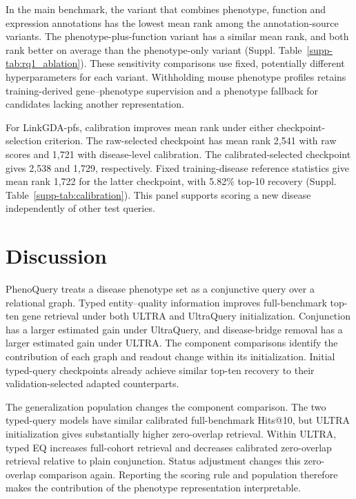 \documentclass[webpdf,contemporary,large]{oup-authoring-template}%
\theoremstyle{thmstyleone}%
\theoremstyle{thmstyletwo}%
\theoremstyle{thmstylethree}%
\begin{document}
In the main benchmark, the variant that combines phenotype, function and
expression annotations has the lowest mean rank among the annotation-source
variants. The phenotype-plus-function variant has a similar mean rank, and
both rank better on average than the phenotype-only variant
(Suppl. Table~\ref{supp-tab:rq1_ablation}). These sensitivity
comparisons use fixed, potentially different hyperparameters for each variant.
Withholding mouse phenotype
profiles retains training-derived gene--phenotype supervision and a phenotype
fallback for candidates lacking another representation.

For LinkGDA-pfs, calibration improves mean rank under either
checkpoint-selection criterion. The raw-selected checkpoint has mean rank
2{,}541 with raw scores and 1{,}721 with disease-level calibration. The
calibrated-selected checkpoint gives 2{,}538 and 1{,}729, respectively.
Fixed training-disease reference statistics give mean rank 1{,}722 for the
latter checkpoint, with 5.82\% top-10 recovery (Suppl. Table~\ref{supp-tab:calibration}). This panel
supports scoring a new disease independently of other test queries.

\section{Discussion}

PhenoQuery treats a disease phenotype set as a conjunctive query over a
relational graph. Typed entity--quality information improves full-benchmark
top-ten gene retrieval under both ULTRA and UltraQuery initialization. Conjunction has a larger
estimated gain under UltraQuery, and disease-bridge removal has a larger estimated
gain under ULTRA. The component comparisons identify the contribution of each
graph and readout change within its initialization. Initial
typed-query checkpoints already achieve similar top-ten recovery to their
validation-selected adapted counterparts.

The generalization population changes the component comparison. The two
typed-query models have similar calibrated full-benchmark Hits@10, but ULTRA
initialization gives substantially higher zero-overlap retrieval. Within ULTRA,
typed EQ increases full-cohort retrieval and decreases calibrated zero-overlap
retrieval relative to plain conjunction. Status adjustment changes this
zero-overlap comparison again. Reporting the scoring rule and population
therefore makes the contribution of the phenotype representation interpretable.
\end{document}
